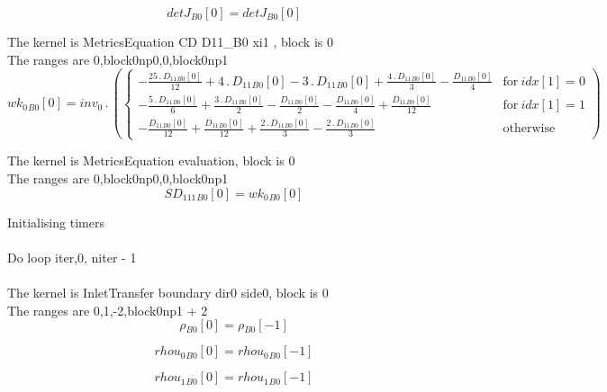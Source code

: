 \documentclass{article}
\begin{document}
\begin{dmath}{detJ{_{B0}}}[{0}] = {detJ{_{B0}}}[{0}]\end{dmath}

\noindent The kernel is MetricsEquation CD D11_B0 xi1 , block is 0\\\noindent The ranges are 0,block0np0,0,block0np1\\\begin{dmath}{wk_{0}{_{B0}}}[{0}] = inv_0 \,.\, \left(\begin{cases} - \frac{25 \,.\, {D_{11}{_{B0}}}[{0}]}{12} + 4 \,.\, {D_{11}{_{B0}}}[{0}] - 3 \,.\, {D_{11}{_{B0}}}[{0}] + \frac{4 \,.\, {D_{11}{_{B0}}}[{0}]}{3} - \frac{{D_{11}{_{B0}}}[{0}]}{4} & 
\text{for}\: {idx}[{1}] = 0 \\- \frac{5 \,.\, {D_{11}{_{B0}}}[{0}]}{6} + \frac{3 \,.\, {D_{11}{_{B0}}}[{0}]}{2} - \frac{{D_{11}{_{B0}}}[{0}]}{2} - \frac{{D_{11}{_{B0}}}[{0}]}{4} + \frac{{D_{11}{_{B0}}}[{0}]}{12} & \text{for}\: {idx}[{1}] = 1 \\- 
\frac{{D_{11}{_{B0}}}[{0}]}{12} + \frac{{D_{11}{_{B0}}}[{0}]}{12} + \frac{2 \,.\, {D_{11}{_{B0}}}[{0}]}{3} - \frac{2 \,.\, {D_{11}{_{B0}}}[{0}]}{3} & \text{otherwise} \end{cases}\right)\end{dmath}

\noindent The kernel is MetricsEquation evaluation, block is 0\\\noindent The ranges are 0,block0np0,0,block0np1\\\begin{dmath}{SD_{111}{_{B0}}}[{0}] = {wk_{0}{_{B0}}}[{0}]\end{dmath}

\noindent Initialising timers\\
\\\noindent Do loop iter,0, niter - 1\\
\\\noindent The kernel is InletTransfer boundary dir0 side0, block is 0\\\noindent The ranges are 0,1,-2,block0np1 + 2\\\begin{dmath}{\rho{_{B0}}}[{0}] = {\rho{_{B0}}}[{-1}]\end{dmath}

\begin{dmath}{rhou_{0}{_{B0}}}[{0}] = {rhou_{0}{_{B0}}}[{-1}]\end{dmath}

\begin{dmath}{rhou_{1}{_{B0}}}[{0}] = {rhou_{1}{_{B0}}}[{-1}]\end{dmath}
\end{document}
